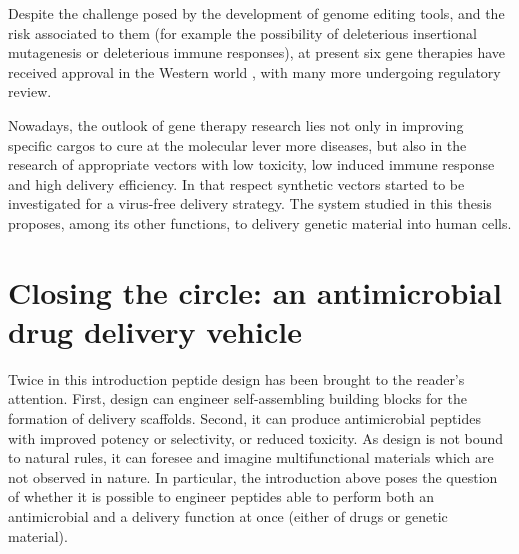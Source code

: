 Despite the challenge posed by the development of genome editing tools, and the risk associated to them (for example the possibility of deleterious insertional mutagenesis or deleterious immune responses), at present six gene therapies have received approval in the Western world \cite{Anguela2019}, with many more undergoing regulatory review. 

Nowadays, the outlook of gene therapy research lies not only in improving specific cargos to cure at the molecular lever more diseases, but also in the research of appropriate vectors with low toxicity, low induced immune response and high delivery efficiency. In that respect synthetic vectors started to be investigated for a virus-free delivery strategy. The system studied in this thesis proposes, among its other functions, to delivery genetic material into human cells.


\section{Closing the circle: an antimicrobial drug delivery vehicle}


Twice in this introduction peptide design has been brought to the reader's attention. First, design can engineer self-assembling building blocks for the formation of delivery scaffolds. Second, it can produce antimicrobial peptides with improved potency or selectivity, or reduced toxicity. As design is not bound to natural rules, it can foresee and imagine multifunctional materials which are not observed in nature. In particular, the introduction above poses the question of whether it is possible to engineer peptides able to perform both an antimicrobial and a delivery function at once (either of drugs or genetic material).

